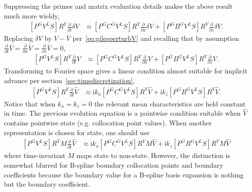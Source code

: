 \documentclass[letterpaper,11pt,nointlimits,reqno,draft]{amsbook}
\newcommand{\ii}{\ensuremath{\mathrm{i}}}
\begin{document}
Suppressing the primes and matrix evaluation details makes the above result
much more wieldy,
\begin{align}
\label{eq:dimeulertransformcharnotYphys}
  \left[P^G V^L S\right]
  R^Y
  \frac{\partial}{\partial{}t}
  \delta{}V
&\approx
  \left[P^G C^G V^L S\right]
  R^Y
  \frac{\partial}{\partial{}x}
  \delta{}V
  +
  \left[P^G B^G V^L S\right]
  R^Y
  \frac{\partial}{\partial{}z}
  \delta{}V
.
\end{align}
Replacing $\delta{}V$ by $V - \bar{V}$ per~\eqref{eq:gilesperturbV} and
recalling that by assumption
$
    \frac{\partial}{\partial{}t} \bar{V}
  = \frac{\partial}{\partial{}x} \bar{V}
  = \frac{\partial}{\partial{}z} \bar{V}
  = 0
$,
\begin{align}
  \left[P^G V^L S\right]
  R^Y
  \frac{\partial}{\partial{}t}
  V
&\approx
  \left[P^G C^G V^L S\right]
  R^Y
  \frac{\partial}{\partial{}x}
  V
  +
  \left[P^G B^G V^L S\right]
  R^Y
  \frac{\partial}{\partial{}z}
  V
.
\end{align}
Transforming to Fourier space gives a linear condition almost suitable for
implicit advance per section~\ref{sec:timediscretization},
\begin{align}
  \left[P^G V^L S\right]
  R^Y
  \frac{\partial}{\partial{}t}
  \hat{V}
&\approx
  \ii k_x
  \left[P^G C^G V^L S\right]
  R^Y
  \hat{V}
  +
  \ii k_z
  \left[P^G B^G V^L S\right]
  R^Y
  \hat{V}
.
\end{align}
Notice that when $k_x=k_z=0$ the relevant mean characteristics are held
constant in time.  The previous evolution equation is a pointwise condition
suitable when $\hat{V}$ contains pointwise state (e.g. collocation point
values).  When another representation is chosen for state, one should use
\begin{align}
\label{eq:dimeulertransformcharnotYwave}
  \left[P^G V^L S\right]
  R^Y
  M \frac{\partial}{\partial{}t}
  \hat{V}
&\approx
  \ii k_x
  \left[P^G C^G V^L S\right]
  R^Y
  M \hat{V}
  +
  \ii k_z
  \left[P^G B^G V^L S\right]
  R^Y
  M \hat{V}
\end{align}
where time-invariant $M$ maps state to non-state.  However, the distinction is
somewhat blurred for B-spline boundary collocation points and boundary
coefficients because the boundary value for a B-spline basis expansion is
nothing but the boundary coefficient.
\end{document}
